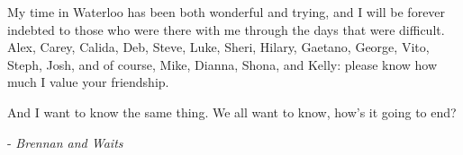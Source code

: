 My time in Waterloo has been both wonderful and trying, and I will be forever indebted to those who were there with me through the days that were difficult.    Alex, Carey, Calida, Deb, Steve, Luke, Sheri, Hilary, Gaetano, George, Vito, Steph, Josh, and of course, Mike, Dianna, Shona, and Kelly:  please know how much I value your friendship.



\cleardoublepage


\begin{center}\textbf{ }\end{center}

\vspace{5cm}

And I want to know the same thing.  We all want to know, how's it going to end?

- \it Brennan and Waits \rm
\cleardoublepage

\renewcommand\contentsname{Table of Contents}
\tableofcontents
\cleardoublepage
{}























